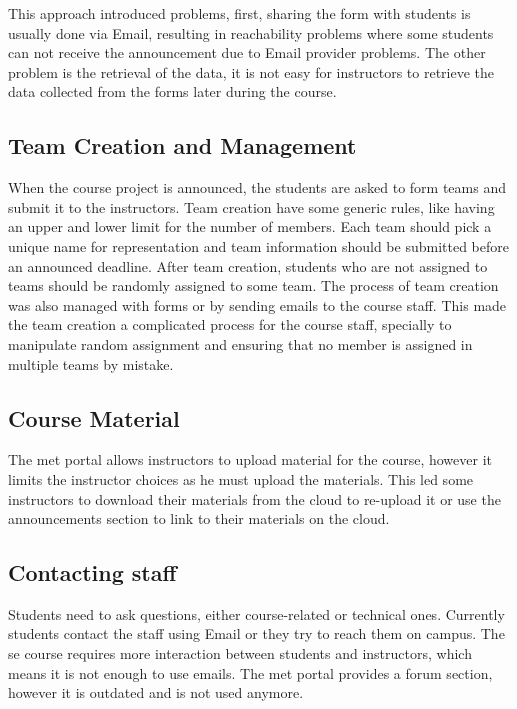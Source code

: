 \newParagraph
This approach introduced problems, first, sharing the form with students is usually done via Email,
resulting in reachability problems where some students can not receive the announcement due to Email provider problems.
The other problem is the retrieval of the data, it is not easy for instructors to retrieve
the data collected from the forms later during the course.

\subsection{Team Creation and Management}
\label{sub:team-management}
When the course project is announced, the students are asked to form teams and submit it to the instructors. Team creation
have some generic rules, like having an upper and lower limit for the number of members. Each team should pick
a unique name for representation and team information should be submitted before an announced deadline. After team creation, students
who are not assigned to teams should be randomly assigned to some team. The process of team
creation was also managed with forms or by sending emails to the course staff. This made the team creation a complicated
process for the course staff, specially to manipulate random assignment and ensuring that no member is assigned in multiple teams
by mistake.

\subsection{Course Material}
\label{sub:course-material}
The \ac{met} portal allows instructors to upload material for the course, however it limits the instructor choices as
he must upload the materials. This led some instructors to download their materials from the cloud
to re-upload it or use the announcements section to link to their materials on the cloud.

\subsection{Contacting staff}
\label{sub:contacting-staff}
Students need to ask questions, either course-related or technical ones. Currently students contact the staff using Email or they try to reach them on
campus. The \ac{se} course requires more interaction between students and instructors, which means
it is not enough to use emails. The \ac{met} portal provides a forum section, however it is outdated and is not used anymore.

